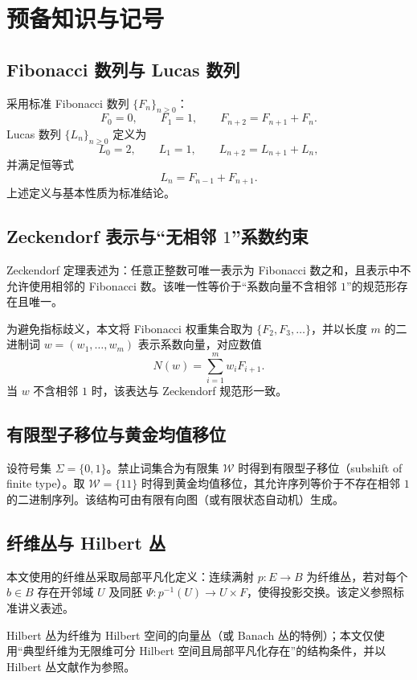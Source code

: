 \section{预备知识与记号}

\subsection{Fibonacci 数列与 Lucas 数列}

采用标准 Fibonacci 数列 $\{F_n\}_{n\ge 0}$：
$$
F_0=0,\qquad F_1=1,\qquad F_{n+2}=F_{n+1}+F_n.
$$
Lucas 数列 $\{L_n\}_{n\ge 0}$ 定义为
$$
L_0=2,\qquad L_1=1,\qquad L_{n+2}=L_{n+1}+L_n,
$$
并满足恒等式
$$
L_n=F_{n-1}+F_{n+1}.
$$
上述定义与基本性质为标准结论。\cite{wikipedia_fibonacci}

\subsection{\texorpdfstring{Zeckendorf 表示与“无相邻 $1$”系数约束}{Zeckendorf 表示与无相邻 1 系数约束}}

Zeckendorf 定理表述为：任意正整数可唯一表示为 Fibonacci 数之和，且表示中不允许使用相邻的 Fibonacci 数。该唯一性等价于“系数向量不含相邻 $1$”的规范形存在且唯一。\cite{kkmw_zeckendorf_summands,kimberling_zeckendorf}

为避免指标歧义，本文将 Fibonacci 权重集合取为 $\{F_2,F_3,\dots\}$，并以长度 $m$ 的二进制词 $w=(w_1,\dots,w_m)$ 表示系数向量，对应数值
$$
N(w)=\sum_{i=1}^{m} w_i F_{i+1}.
$$
当 $w$ 不含相邻 $1$ 时，该表达与 Zeckendorf 规范形一致。

\subsection{有限型子移位与黄金均值移位}

设符号集 $\Sigma=\{0,1\}$。禁止词集合为有限集 $\mathcal W$ 时得到有限型子移位（subshift of finite type）。取 $\mathcal W=\{11\}$ 时得到黄金均值移位，其允许序列等价于不存在相邻 $1$ 的二进制序列。该结构可由有限有向图（或有限状态自动机）生成。\cite{scholarpedia_symbolic_dynamics}

\subsection{纤维丛与 Hilbert 丛}

本文使用的纤维丛采取局部平凡化定义：连续满射 $p:E\to B$ 为纤维丛，若对每个 $b\in B$ 存在开邻域 $U$ 及同胚 $\Psi:p^{-1}(U)\to U\times F$，使得投影交换。该定义参照标准讲义表述。\cite{cohen_fiber_bundles}

Hilbert 丛为纤维为 Hilbert 空间的向量丛（或 Banach 丛的特例）；本文仅使用“典型纤维为无限维可分 Hilbert 空间且局部平凡化存在”的结构条件，并以 Hilbert 丛文献作为参照。\cite{kato_hilbert_bundles}
